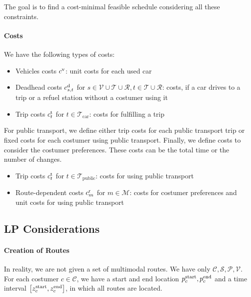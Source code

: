 The goal is to find a cost-minimal feasible schedule considering all these constraints.

\paragraph{Costs} \parfill

We have the following types of costs:

\begin{itemize}
	\item{Vehicles costs $c^{\operatorname{v}}$: unit costs for each used car}
	\item{Deadhead costs $c^{\operatorname{d}}_{s,t}$ for $s\in\mathcal{V}\cup\mathcal{T}\cup\mathcal{R}, t\in\mathcal{T}\cup\mathcal{R}$: costs, if a car drives to a trip or a refuel station without a costumer using it}
	\item{Trip costs $c^{\operatorname{t}}_t$ for $t\in\mathcal{T}_{\operatorname{car}}$: costs for fulfilling a trip}
\end{itemize}

For public transport, we define either trip costs for each public transport trip or fixed costs for each costumer using public transport. Finally, we define costs to consider the costumer preferences. These costs can be the total time or the number of changes.

\begin{itemize}
	\item{Trip costs $c^{\operatorname{t}}_t$ for $t\in\mathcal{T}_{\operatorname{public}}$: costs for using public transport}
	\item{Route-dependent costs $c^{\operatorname{r}}_m$ for $m\in\mathcal{M}$: costs for costumer preferences and unit costs for using public transport}
\end{itemize}


\subsection{LP Considerations}

\paragraph{Creation of Routes} \parfill

In reality, we are not given a set of multimodal routes. We have only $\mathcal{C}, \mathcal{S}, \mathcal{P}, \mathcal{V}$. For each costumer $c\in\mathcal{C}$, we have a start and end location $p^{\operatorname{start}}_c, p^{\operatorname{end}}_c$ and a time interval $\left[z^{\operatorname{start}}_c,z^{\operatorname{end}}_c\right]$, in which all routes are located.

